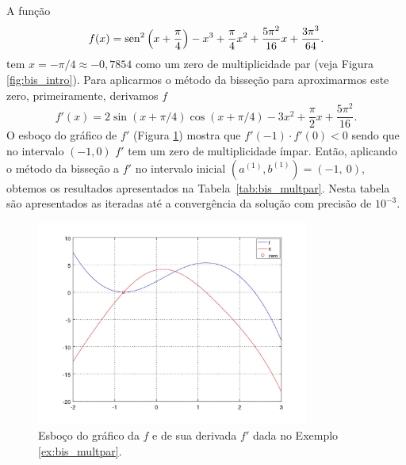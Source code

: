 \begin{ex}\label{ex:bis_multpar}
  A função
\begin{equation}
  f(x) = \operatorname{sen}^2\left(x+\frac{\pi}{4}\right) - x^3 + \frac{\pi}{4}x^2 + \frac{5\pi^2}{16}x + \frac{3\pi^3}{64}.
\end{equation}
tem $x=-\pi/4\approx -0,7854$ como um zero de multiplicidade par (veja Figura \ref{fig:bis_intro}). Para aplicarmos o método da bisseção para aproximarmos este zero, primeiramente, derivamos $f$
\begin{equation}
  f'(x) = 2\sin(x+\pi/4)\cos(x+\pi/4) - 3x^2 + \frac{\pi}{2}x + \frac{5\pi^2}{16}.
\end{equation}
O esboço do gráfico de $f'$ (Figura \ref{fig:bis_multpar}) mostra que $f'(-1)\cdot f'(0) < 0$ sendo que no intervalo $(-1, 0)$ $f'$ tem um zero de multiplicidade ímpar. Então, aplicando o método da bisseção a $f'$ no intervalo inicial $(a^{(1)}, b^{(1)}) = (-1, ~0)$, obtemos os resultados apresentados na Tabela~\ref{tab:bis_multpar}. Nesta tabela são apresentados as iteradas até a convergência da solução com precisão de $10^{-3}$.

\begin{figure}[h!]
  \centering
  \includegraphics[width=0.8\textwidth]{./cap_eq1d/dados/ex_bis_multpar/fig_bis_multpar}
  \caption{Esboço do gráfico da $f$ e de sua derivada $f'$ dada no Exemplo \ref{ex:bis_multpar}.}
  \label{fig:bis_multpar}
\end{figure}


\end{ex}
